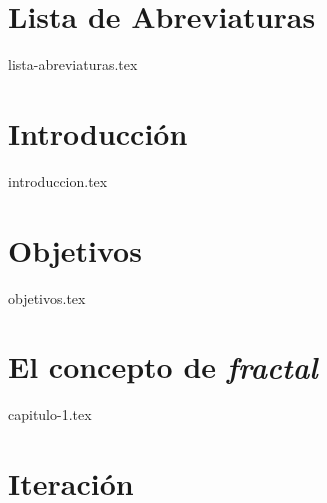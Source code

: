 \documentclass[twoside,openright,11pt]{report}
\begin{document}

\tableofcontents
\thispagestyle{plain}



\chapter*{Lista de Abreviaturas}

{lista-abreviaturas.tex}

\listoffigures
\thispagestyle{plain}



\chapter*{Introducción}


{introduccion.tex}

\chapter*{Objetivos}
\label{chap:Objetivos}

{objetivos.tex}

\chapter{El concepto de \textit{fractal}}
\label{chap:concepto}

{capitulo-1.tex}

\chapter{Iteración}
\label{chap:iteracion}
\end{document}
